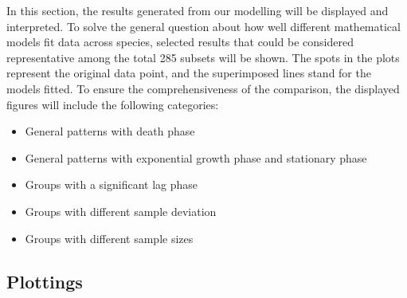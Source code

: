 \documentclass[11pt, oneside]{article}
\begin{document}
		In this section, the results generated from our modelling will be displayed and interpreted. To solve the general question about how well different mathematical models fit data across species, selected results that could be considered representative among the total 285 subsets will be shown. The spots in the plots represent the original data point, and the superimposed lines stand for the models fitted. To ensure the comprehensiveness of the comparison, the displayed figures will include the following categories:
		\begin{itemize}
		\item General patterns with death phase
		\item General patterns with exponential growth phase and stationary phase
		\item Groups with a significant lag phase
		\item Groups with different sample deviation
		\item Groups with different sample sizes
		\end{itemize}
		
		\subsection{Plottings}
\end{document}
